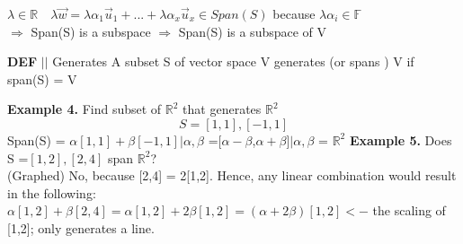 \documentclass [12pt]{article}
\begin{document}
$\lambda\in\mathbb{R}\quad \lambda\overrightarrow{w}=\lambda\alpha_1\overrightarrow{u}_1+...+\lambda\alpha_x\overrightarrow{u}_x\in Span(S)$ because $\lambda\alpha_i\in\mathbb{F}$\\
$\Rightarrow$ Span(S) is a subspace $\Rightarrow$ Span(S) is a subspace of V
\begin{framed}
\noindent\textbf{DEF} $||$ Generates 
A subset S of vector space V generates (or spans ) V if span(S) = V
\end{framed}
\textbf{Example 4.} Find subset of $\mathbb{R}^2$ that generates $\mathbb{R}^2$
\[S={[1,1],[-1,1]}\]
Span(S) = ${\alpha[1,1]+\beta[-1,1]|\alpha,\beta}$
={[$\alpha-\beta$,$\alpha+\beta$]$|\alpha,\beta$} = $\mathbb{R}^2$
\textbf{Example 5. } Does S =${[1,2],[2,4]}$ span $\mathbb{R}^2$?\\
(Graphed) No, because [2,4] = 2[1,2]. Hence, any linear combination would result in the following: $\alpha[1,2] + \beta[2,4] = \alpha[1,2]+2\beta[1,2]=(\alpha+2\beta)[1,2] <- $ the scaling of [1,2]; only generates a line.
\end{document}
